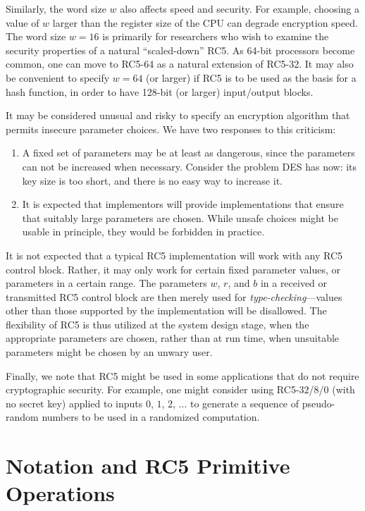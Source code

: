 Similarly, the word size $w$ also affects speed and security.  For
example, choosing a value of $w$ larger than the register size of the
CPU can degrade encryption speed.  The word size $w = 16$ is primarily
for researchers who wish to examine the security properties of a
natural ``scaled-down'' RC5.  As 64-bit processors become common, one
can move to RC5-64 as a natural extension of RC5-32.  It may also be
convenient to specify $w=64$ (or larger) if RC5 is to be used as the
basis for a hash function, in order to have 128-bit (or larger)
input/output blocks.

It may be considered unusual and risky to specify an
encryption algorithm that 
permits insecure parameter choices.  We have two responses
to this criticism:
\begin{enumerate}
\item
  A fixed set of parameters may be at least as dangerous,
  since the parameters can not be increased when necessary.
  Consider the problem DES has now:
  its key size is too short, and there is no easy way to
  increase it.
\item
  It is expected that implementors will provide
  implementations that ensure that suitably large parameters
  are chosen.  While unsafe choices might be usable in
  principle, they would be forbidden in practice.
\end{enumerate}

It is not expected that a typical RC5 implementation will work with
any RC5 control block.  Rather, it may only work for certain fixed
parameter values, or parameters in a certain range.  The parameters
$w$, $r$, and $b$ in a received or transmitted RC5 control block are
then merely used for {\em type-checking}---values other than those
supported by the implementation will be disallowed.  The flexibility
of RC5 is thus utilized at the system design stage, when the
appropriate parameters are chosen, rather than at run time, when
unsuitable parameters might be chosen by an unwary user.

Finally, we note that RC5 might be used in some applications that do
not require cryptographic security.  For example, one might consider
using RC5-$32$/$8$/$0$ (with no secret key) applied to inputs $0$,
$1$, $2$, ... to generate a sequence of pseudo-random numbers to be
used in a randomized computation.

\section{Notation and RC5 Primitive Operations}

